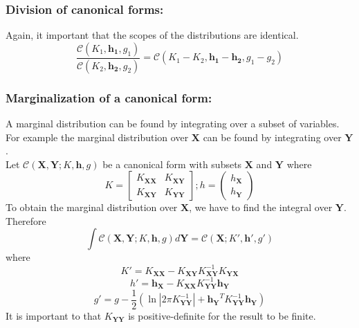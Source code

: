 \documentclass[12pt,oneside,openany,a4paper, %
afrikaans,english,
]{memoir}
\numberwithin{equation}{chapter}
\begin{document}
\subsubsection{Division of canonical forms:}
Again, it important that the scopes of the distributions are identical.
\begin{equation}\label{eq:11}
\frac{\mathcal{C}(K_1,\bm{h_1},g_1)}{\mathcal{C}(K_2,\bm{h_2},g_2)} = \mathcal{C}(K_1 - K_2,\bm{h_1} - \bm{h_2},g_1 - g_2)
\end{equation}
\subsubsection{Marginalization of a canonical form:}
A marginal distribution can be found by integrating over a subset of variables. For example the marginal distribution over $\bm{X}$ can be found by integrating over $\bm{Y}$.\\
Let $\mathcal{C}(\bm{X},\bm{Y};K,\bm{h},g)$ be a canonical form with subsets $\bm{X}$ and $\bm{Y}$ where
\begin{equation}
K = 
\begin{bmatrix}
K_{\bm{XX}} & K_{\bm{XY}}\\
K_{\bm{XY}} & K_{\bm{YY}}
\end{bmatrix}
 ; h = 
\begin{pmatrix}
h_{\bm{X}} \\
h_{\bm{Y}}
\end{pmatrix}
\end{equation}
To obtain the marginal distribution over $\bm{X}$, we have to find the integral over $\bm{Y}$. Therefore
\begin{equation}
\int\mathcal{C}(\bm{X},\bm{Y};K,\bm{h},g)d\bm{Y} = \mathcal{C}(\bm{X};K',\bm{h}',g')
\end{equation}
 where
\begin{equation}
K' = K_{\bm{XX}} - K_{\bm{XY}}K_{\bm{XY}}^{-1}K_{\bm{YX}}
\end{equation}
\begin{equation}
h' = \bm{h}_{\bm{X}} - K_{\bm{XX}}K_{\bm{YY}}^{-1}\bm{h}_{\bm{Y}}
\end{equation}
\begin{equation}
g' = g - \frac{1}{2}\left(\ln|2\pi K_{\bm{YY}}^{-1}|+ \bm{h_Y}^T K_{\bm{YY}}^{-1}\bm{h_Y}\right)
\end{equation}
It is important to that $K_{\bm{YY}}$ is positive-definite for the result to be finite.
\end{document}
